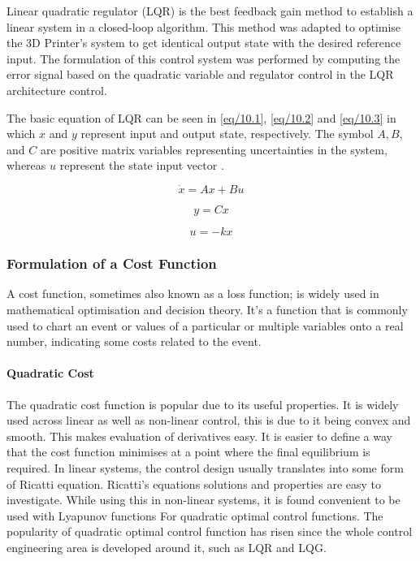 \documentclass{UoNMCHA}
\numberwithin{equation}{section}
\begin{document}
	Linear quadratic regulator (LQR) is the best feedback gain method to establish a linear system in a closed-loop algorithm. This method was adapted to optimise the 3D Printer's system to get identical output state with the desired reference input. The formulation of this control system was performed by computing the error signal based on the quadratic variable and regulator control in the LQR architecture control. 
	
	The basic equation of LQR can be seen in \eqref{eq/10.1}, \eqref{eq/10.2} and \eqref{eq/10.3} in which $ x $ and $ y $ represent input and output state, respectively. The symbol $ A,B $, and $ C $ are positive matrix variables representing uncertainties in the system, whereas $ u $ represent the state input vector \cite{kuantama_2018_feedback}.
	
	\begin{equation}\label{eq/10.1}
	\dot{x} = Ax + Bu 
	\end{equation}

	\begin{equation}\label{eq/10.2}
	y = Cx 
 	\end{equation}
 
	\begin{equation}\label{eq/10.3}
	u = -kx
  	\end{equation}
	  


	
	\subsubsection{Formulation of a Cost Function }
	
	A cost function, sometimes also known as a loss function; is widely used in mathematical optimisation and decision theory. It's a function that is commonly used to chart an event or values of a particular or multiple variables onto a real number, indicating some costs related to the event.
	
	\paragraph{Quadratic Cost}
	The quadratic cost function is popular due to its useful properties. It is widely used across linear as well as non-linear control, this is due to it being convex and smooth. This makes evaluation of derivatives easy. It is easier to define a way that the cost function minimises at a point where the final equilibrium is required. In linear systems, the control design usually translates into some form of Ricatti equation. Ricatti's equations solutions and properties are easy to investigate. While using this in non-linear systems, it is found convenient to be used with Lyapunov functions For quadratic optimal control functions. The popularity of quadratic optimal control function has risen since the whole control engineering area is developed around it, such as LQR and LQG.\\
	
\end{document}
